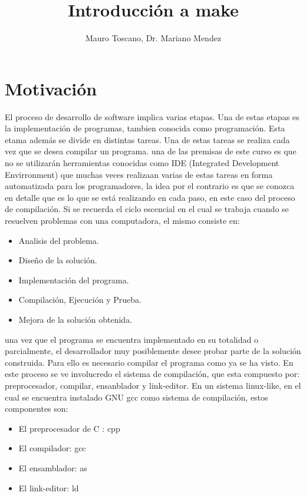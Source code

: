 \documentclass[]{article}
\title{Introducci\'{o}n a make}
\author{Mauro Toscano, Dr. Mariano Mendez}
\begin{document}
\maketitle{}

\section{Motivación}
        El proceso de desarrollo de software implica varias etapas. Una de estas etapas es la implementación de programas, tambien conocida como programación. Esta etama además se divide en distintas tareas. Una de estas tareas se realiza cada vez que se desea compilar un programa. una de las premisas de este curso es que no se utilizarán herramientas conocidas como IDE (Integrated Development Envirronment) que muchas veces realizaan varias de estas tareas en forma automatizada para los programadores, la idea por el contrario es que se conozca en detalle que es lo que se está realizando en cada paso, en este caso del proceso de compilación.
	Si se recuerda el ciclo escencial en el cual se trabaja cuando se resuelven problemas con una computadora, el mismo consiste en:
        \begin{itemize}
		\item Analisis del problema.
		\item Diseño de la solución.
                \item Implementación del programa.
		\item Compilación, Ejecución y Prueba.
                \item Mejora de la solución obtenida.
        \end{itemize}	
	una vez que el programa se encuentra implementado en su totalidad o parcialmente, el desarrollador muy posiblemente desee probar parte de la solución construida. Para ello es necesario compilar el programa como ya se ha visto. En este proceso se ve involucredo el sistema de compilación, que esta compuesto por: preprocesador, compilar, ensanblador y link-editor. En un sistema linux-like, en el cual se encuentra instalado GNU gcc como sistema de compilación, estos componentes son:
        \begin{itemize}
		\item El preprocesador de C : cpp 
		\item El compilador: gcc
                \item El ensamblador: as
		\item El link-editor: ld
        \end{itemize}	
	
\end{document}

